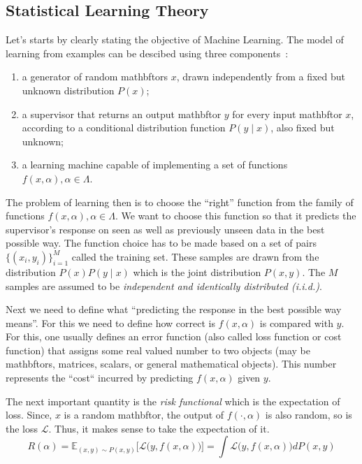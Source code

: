 \documentclass[11pt]{article}
\begin{document}
\subsection{Statistical Learning Theory}
Let's starts by clearly stating the objective of Machine Learning. The model of
learning from examples can be descibed using three components~\cite{slt}:
\begin{enumerate}
    \item a generator of random mathbftors $x$, drawn independently from a fixed
        but unknown distribution $P(x)$;
    \item a supervisor that returns an output mathbftor $y$ for every input mathbftor
        $x$, according to a conditional distribution function $P(y\;\lvert\;x)$,
        also fixed but unknown;
    \item a learning machine capable of implementing a set of functions
        $f(x,\alpha), \alpha\in\Lambda$.
\end{enumerate}
The problem of learning then is to choose the ``right'' function from the family
of functions $f(x,\alpha), \alpha\in\Lambda$. We want to choose this function so
that it predicts the supervisor's response on seen as well as previously unseen
data in the best possible way. The function choice has to be made based on a set
of pairs $\{(x_i,y_i)\}_{i=1}^M$ called the training set. These samples are
drawn from the distribution $P(x)P(y\;\lvert\;x)$ which is the joint
distribution $P(x,y)$. The $M$ samples are assumed to be {\em independent and
identically distributed (i.i.d.)}.\par
Next we need to define what ``predicting the response in the best possible way
means''. For this we need to define how correct is $f(x,\alpha)$ is compared
with
$y$. For this, one usually defines an error function (also called loss function or
cost function) that assigns some real valued number to two objects (may be
mathbftors, matrices, scalars, or general mathematical objects). This number
represents the ``cost`` incurred by predicting $f(x,\alpha)$ given $y$.\par
The next important quantity is the {\em risk functional} which is the
expectation of loss. Since, $x$ is a random mathbftor, the output of
$f(\cdot,\alpha)$ is also random, so is the loss $\mathcal{L}$. Thus, it makes
sense to take the expectation of it.
\begin{equation}
    R(\alpha)=\mathbb{E}_{(x,y)\sim
    P(x,y)}\biggl[\mathcal{L}\bigl(y,f(x,\alpha)\bigr)\biggr]=\int
    \mathcal{L}\bigl(y,f(x,\alpha)\bigr)dP(x,y)
\end{equation}
\end{document}
